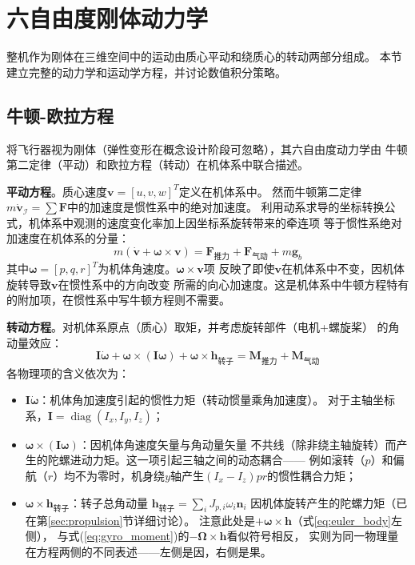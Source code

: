 \section{六自由度刚体动力学}
\label{sec:dynamics}

整机作为刚体在三维空间中的运动由质心平动和绕质心的转动两部分组成。
本节建立完整的动力学和运动学方程，并讨论数值积分策略。

\subsection{牛顿-欧拉方程}

将飞行器视为刚体（弹性变形在概念设计阶段可忽略），其六自由度动力学由
牛顿第二定律（平动）和欧拉方程（转动）在机体系中联合描述\cite{stevens2015aircraft}。

\textbf{平动方程}。质心速度$\bm{v} = [u, v, w]^T$定义在机体系中。
然而牛顿第二定律$m\dot{\bm{v}}_{\mathcal{I}} = \sum \bm{F}$中的加速度是惯性系中的绝对加速度。
利用动系求导的坐标转换公式，机体系中观测的速度变化率加上因坐标系旋转带来的牵连项
等于惯性系绝对加速度在机体系的分量：
\begin{equation}
    m \left( \dot{\bm{v}} + \bm{\omega} \times \bm{v} \right)
    = \bm{F}_{\text{推力}} + \bm{F}_{\text{气动}} + m \bm{g}_b
    \label{eq:newton_body}
\end{equation}
其中$\bm{\omega} = [p, q, r]^T$为机体角速度。$\bm{\omega} \times \bm{v}$项
反映了即使$\bm{v}$在机体系中不变，因机体旋转导致$\bm{v}$在惯性系中的方向改变
所需的向心加速度。这是机体系中牛顿方程特有的附加项，在惯性系中写牛顿方程则不需要。

\textbf{转动方程}。对机体系原点（质心）取矩，并考虑旋转部件（电机+螺旋桨）
的角动量效应：
\begin{equation}
    \bm{I} \dot{\bm{\omega}} + \bm{\omega} \times (\bm{I} \bm{\omega})
    + \bm{\omega} \times \bm{h}_{\text{转子}}
    = \bm{M}_{\text{推力}} + \bm{M}_{\text{气动}}
    \label{eq:euler_body}
\end{equation}
各物理项的含义依次为：
\begin{itemize}
    \item $\bm{I} \dot{\bm{\omega}}$：机体角加速度引起的惯性力矩（转动惯量乘角加速度）。
          对于主轴坐标系，$\bm{I} = \operatorname{diag}(I_x, I_y, I_z)$；
    \item $\bm{\omega} \times (\bm{I} \bm{\omega})$：因机体角速度矢量与角动量矢量
          不共线（除非绕主轴旋转）而产生的陀螺进动力矩。这一项引起三轴之间的动态耦合——
          例如滚转（$p$）和偏航（$r$）均不为零时，机身绕$y$轴产生$(I_x-I_z)pr$的惯性耦合力矩；
    \item $\bm{\omega} \times \bm{h}_{\text{转子}}$：转子总角动量
          $\bm{h}_{\text{转子}} = \sum_i J_{p,i} \omega_i \bm{n}_i$
          因机体旋转产生的陀螺力矩（已在第\ref{sec:propulsion}节详细讨论）。
          注意此处是$+\bm{\omega} \times \bm{h}$（式\ref{eq:euler_body}左侧），
          与式(\ref{eq:gyro_moment})的$-\bm{\Omega} \times \bm{h}$看似符号相反，
          实则为同一物理量在方程两侧的不同表述——左侧是因，右侧是果。
\end{itemize}

